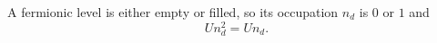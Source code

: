 \documentclass{article}
\begin{document}
A fermionic level is either empty or filled, so its occupation $n_d$ is $0$ or $1$ and
\begin{equation}
U n_d^2 = U n_d .
\label{eq:n2}
\end{equation}
\end{document}
